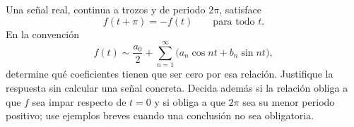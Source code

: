 Una señal real, continua a trozos y de periodo \(2\pi\), satisface
\[
f(t+\pi)=-f(t)\qquad\text{para todo }t.
\]
En la convención
\[
f(t)\sim\frac{a_0}{2}+\sum_{n=1}^{\infty}
\bigl(a_n\cos nt+b_n\sin nt\bigr),
\]
determine qué coeficientes tienen que ser cero por esa relación. Justifique la respuesta sin calcular una señal concreta. Decida además si la relación obliga a que \(f\) sea impar respecto de \(t=0\) y si obliga a que \(2\pi\) sea su menor periodo positivo; use ejemplos breves cuando una conclusión no sea obligatoria.
